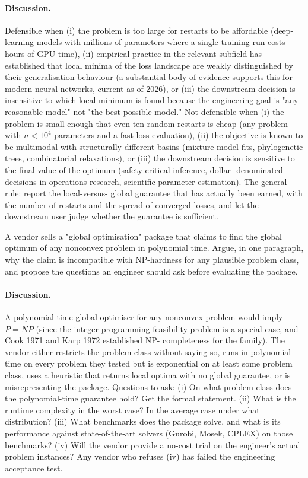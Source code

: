 \paragraph{Discussion.}
Defensible when (i) the problem is too large for restarts to be
affordable (deep-learning models with millions of parameters where
a single training run costs hours of GPU time), (ii) empirical
practice in the relevant subfield has established that local
minima of the loss landscape are weakly distinguished by their
generalisation behaviour (a substantial body of evidence supports
this for modern neural networks, current as of 2026), or (iii) the
downstream decision is insensitive to which local minimum is
found because the engineering goal is "any reasonable model" not
"the best possible model." Not defensible when (i) the problem is
small enough that even ten random restarts is cheap (any problem
with $n < 10^{4}$ parameters and a fast loss evaluation), (ii) the
objective is known to be multimodal with structurally different
basins (mixture-model fits, phylogenetic trees, combinatorial
relaxations), or (iii) the downstream decision is sensitive to
the final value of the optimum (safety-critical inference, dollar-
denominated decisions in operations research, scientific
parameter estimation). The general rule: report the local-versus-
global guarantee that has actually been earned, with the number
of restarts and the spread of converged losses, and let the
downstream user judge whether the guarantee is sufficient.

\begin{exercise}
A vendor sells a "global optimisation" package that claims to
find the global optimum of any nonconvex problem in polynomial
time. Argue, in one paragraph, why the claim is incompatible
with NP-hardness for any plausible problem class, and propose
the questions an engineer should ask before evaluating the
package.
\end{exercise}

\paragraph{Discussion.}
A polynomial-time global optimiser for any nonconvex problem would
imply $P = NP$ (since the integer-programming feasibility problem
is a special case, and Cook 1971 and Karp 1972 established NP-
completeness for the family). The vendor either restricts the
problem class without saying so, runs in polynomial time on every
problem they tested but is exponential on at least some problem
class, uses a heuristic that returns local optima with no global
guarantee, or is misrepresenting the package. Questions to ask:
(i) On what problem class does the polynomial-time guarantee
hold? Get the formal statement. (ii) What is the runtime
complexity in the worst case? In the average case under what
distribution? (iii) What benchmarks does the package solve, and
what is its performance against state-of-the-art solvers
(Gurobi, Mosek, CPLEX) on those benchmarks? (iv) Will the vendor
provide a no-cost trial on the engineer's actual problem
instances? Any vendor who refuses (iv) has failed the
engineering acceptance test.

